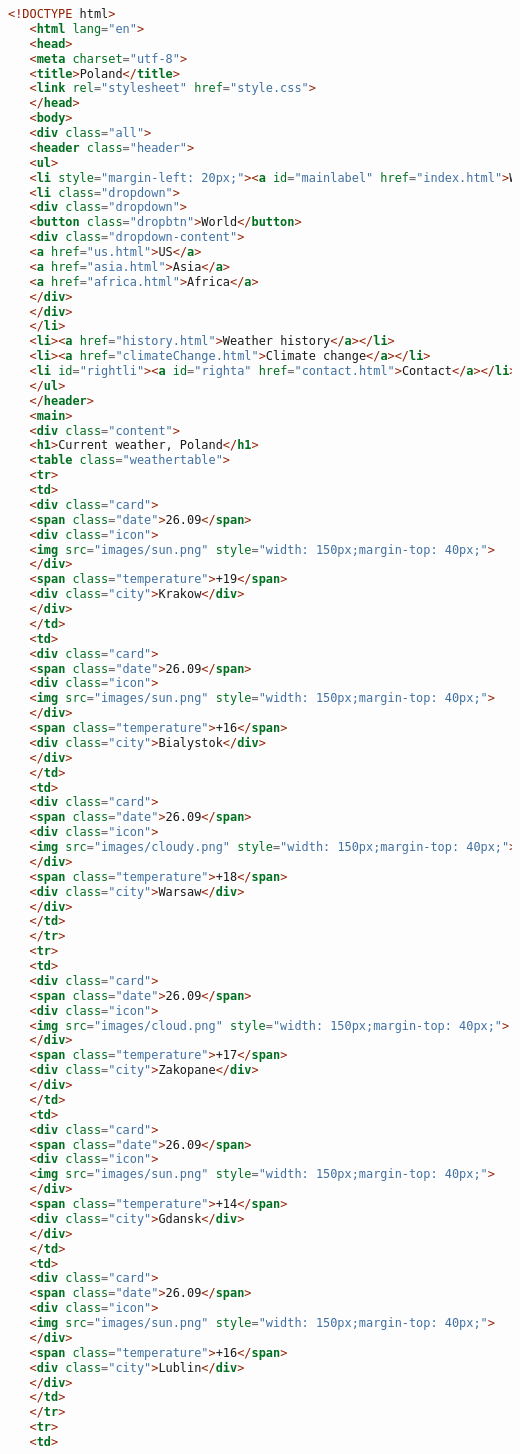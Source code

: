 \begin{lstlisting}[language=HTML,caption=Исходный код страницы Poland]
   <!DOCTYPE html>
   <html lang="en">
   <head>
   <meta charset="utf-8">
   <title>Poland</title>
   <link rel="stylesheet" href="style.css">
   </head>
   <body>
   <div class="all">
   <header class="header">
   <ul>
   <li style="margin-left: 20px;"><a id="mainlabel" href="index.html">Weather.org☔</a></li>
   <li class="dropdown">
   <div class="dropdown">
   <button class="dropbtn">World</button>
   <div class="dropdown-content">
   <a href="us.html">US</a>
   <a href="asia.html">Asia</a>
   <a href="africa.html">Africa</a>
   </div>
   </div>
   </li>
   <li><a href="history.html">Weather history</a></li>
   <li><a href="climateChange.html">Climate change</a></li>
   <li id="rightli"><a id="righta" href="contact.html">Contact</a></li>
   </ul>
   </header>
   <main>
   <div class="content">
   <h1>Current weather, Poland</h1>
   <table class="weathertable">
   <tr>
   <td>
   <div class="card">
   <span class="date">26.09</span>
   <div class="icon">
   <img src="images/sun.png" style="width: 150px;margin-top: 40px;">
   </div>
   <span class="temperature">+19</span>
   <div class="city">Krakow</div>
   </div>
   </td>
   <td>
   <div class="card">
   <span class="date">26.09</span>
   <div class="icon">
   <img src="images/sun.png" style="width: 150px;margin-top: 40px;">
   </div>
   <span class="temperature">+16</span>
   <div class="city">Bialystok</div>
   </div>
   </td>
   <td>
   <div class="card">
   <span class="date">26.09</span>
   <div class="icon">
   <img src="images/cloudy.png" style="width: 150px;margin-top: 40px;">
   </div>
   <span class="temperature">+18</span>
   <div class="city">Warsaw</div>
   </div>
   </td>
   </tr>
   <tr>
   <td>
   <div class="card">
   <span class="date">26.09</span>
   <div class="icon">
   <img src="images/cloud.png" style="width: 150px;margin-top: 40px;">
   </div>
   <span class="temperature">+17</span>
   <div class="city">Zakopane</div>
   </div>
   </td>
   <td>
   <div class="card">
   <span class="date">26.09</span>
   <div class="icon">
   <img src="images/sun.png" style="width: 150px;margin-top: 40px;">
   </div>
   <span class="temperature">+14</span>
   <div class="city">Gdansk</div>
   </div>
   </td>
   <td>
   <div class="card">
   <span class="date">26.09</span>
   <div class="icon">
   <img src="images/sun.png" style="width: 150px;margin-top: 40px;">
   </div>
   <span class="temperature">+16</span>
   <div class="city">Lublin</div>
   </div>
   </td>
   </tr>
   <tr>
   <td>

\end{lstlisting}
